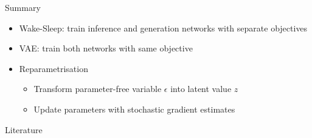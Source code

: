 \documentclass[14pt]{beamer}
\begin{document}
\begin{frame}{Summary}
\begin{itemize}
\item Wake-Sleep: train inference and generation networks with separate objectives
\item VAE: train both networks with same objective
\item Reparametrisation
\begin{itemize}
\item  Transform parameter-free variable $ \epsilon $ into latent value $ z $
\item Update parameters with stochastic gradient estimates
\end{itemize}
\end{itemize}
\end{frame}

\begin{frame}[allowframebreaks]{Literature}
\nocite{KingmaWelling:2013}
\nocite{HintonEtAl:1995}
\nocite{RezendeEtAl:2014}
\nocite{TitsiasLazarogredilla:2014}
\nocite{KucukelbirEtAl:2017}



\end{frame}
\end{document}
